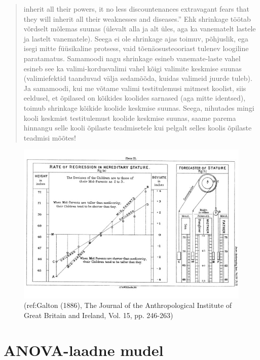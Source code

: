 \documentclass[]{book}
\begin{document}
\begin{quote}
inherit all their powers, it no less discountenances extravagant fears
that they will inherit all their weaknesses and diseases.'' Ehk
shrinkage töötab võrdselt mõlemas suunas (ülevalt alla ja alt üles, aga
ka vanematelt lastele ja lastelt vanematele). Seega ei ole shrinkage
ajas toimuv, põhjuslik, ega isegi mitte füüsikaline protsess, vaid
tõenäosusteooriast tulenev loogiline paratamatus. Samamoodi nagu
shrinkage esineb vanemate-laste vahel esineb see ka valimi-kordusvalimi
vahel kõigi valimite keskmise suunas (valimiefektid taanduvad välja
sedamõõda, kuidas valimeid juurde tuleb). Ja samamoodi, kui me võtame
valimi testitulemusi mitmest koolist, siis eeldusel, et õpilased on
kõikides koolides sarnased (aga mitte identsed), toimub shrinkage
kõikide koolide keskmise suunas. Seega, nihutades mingi kooli keskmist
testitulemust koolide keskmise suunas, saame parema hinnangu selle kooli
õpilaste teadmisetele kui pelgalt selles koolis õpilaste teadmisi
mõõtes!
\end{quote}

\begin{figure}
\includegraphics[width=1.5\linewidth]{img/galton} \caption{(ref:Galton (1886), The Journal of the Anthropological Institute of Great Britain and Ireland, Vol. 15, pp. 246-263)}\label{fig:parun}
\end{figure}

\section{ANOVA-laadne mudel}\label{anova-laadne-mudel}
\end{document}
